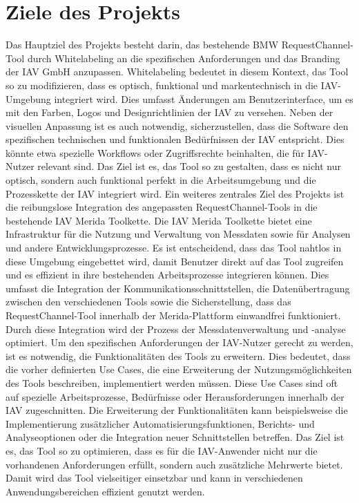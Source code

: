 \section{Ziele des Projekts}
Das Hauptziel des Projekts besteht darin, das bestehende BMW RequestChannel-Tool durch Whitelabeling an die spezifischen Anforderungen und das Branding der IAV GmbH anzupassen. Whitelabeling bedeutet in diesem Kontext, das Tool so zu modifizieren, dass es optisch, funktional und markentechnisch in die IAV-Umgebung integriert wird. Dies umfasst Änderungen am Benutzerinterface, um es mit den Farben, Logos und Designrichtlinien der IAV zu versehen. Neben der visuellen Anpassung ist es auch notwendig, sicherzustellen, dass die Software den spezifischen technischen und funktionalen Bedürfnissen der IAV entspricht. Dies könnte etwa spezielle Workflows oder Zugriffsrechte beinhalten, die für IAV-Nutzer relevant sind. Das Ziel ist es, das Tool so zu gestalten, dass es nicht nur optisch, sondern auch funktional perfekt in die Arbeitsumgebung und die Prozesskette der IAV integriert wird.
\newline
\newline
Ein weiteres zentrales Ziel des Projekts ist die reibungslose Integration des angepassten RequestChannel-Tools in die bestehende IAV Merida Toolkette. Die IAV Merida Toolkette bietet eine Infrastruktur für die Nutzung und Verwaltung von Messdaten sowie für Analysen und andere Entwicklungsprozesse. Es ist entscheidend, dass das Tool nahtlos in diese Umgebung eingebettet wird, damit Benutzer direkt auf das Tool zugreifen und es effizient in ihre bestehenden Arbeitsprozesse integrieren können. Dies umfasst die Integration der Kommunikationsschnittstellen, die Datenübertragung zwischen den verschiedenen Tools sowie die Sicherstellung, dass das RequestChannel-Tool innerhalb der Merida-Plattform einwandfrei funktioniert. Durch diese Integration wird der Prozess der Messdatenverwaltung und -analyse optimiert.
\newline
\newline
Um den spezifischen Anforderungen der IAV-Nutzer gerecht zu werden, ist es notwendig, die Funktionalitäten des Tools zu erweitern. Dies bedeutet, dass die vorher definierten Use Cases, die eine Erweiterung der Nutzungsmöglichkeiten des Tools beschreiben, implementiert werden müssen. Diese Use Cases sind oft auf spezielle Arbeitsprozesse, Bedürfnisse oder Herausforderungen innerhalb der IAV zugeschnitten. Die Erweiterung der Funktionalitäten kann beispielsweise die Implementierung zusätzlicher Automatisierungsfunktionen, Berichts- und Analyseoptionen oder die Integration neuer Schnittstellen betreffen. Das Ziel ist es, das Tool so zu optimieren, dass es für die IAV-Anwender nicht nur die vorhandenen Anforderungen erfüllt, sondern auch zusätzliche Mehrwerte bietet. Damit wird das Tool vielseitiger einsetzbar und kann in verschiedenen Anwendungsbereichen effizient genutzt werden.
